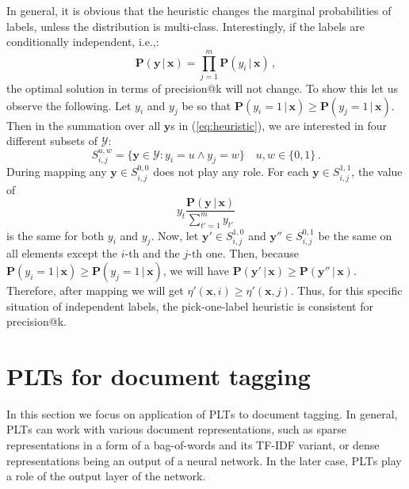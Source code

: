 \documentclass{article}
\newcommand{\Algo}[1]{\textsc{#1}}
\renewcommand{\vec}[1]{\boldsymbol{#1}}
\newcommand{\bx}{\vec{x}}
\newcommand{\by}{\vec{y}}
\newcommand{\calY}{\mathcal{Y}}
\newcommand{\prob}{\mathbf{P}}
\newcommand{\given}{\, | \,}
\newcommand{\sectionBefore}{-0pt}
\newcommand{\sectionAfter}{-0pt}
\begin{document}
In general, it is obvious that the heuristic changes the marginal probabilities of labels, unless the distribution is multi-class. 
Interestingly, if the labels are conditionally independent, i.e.,:
$$
\prob(\by \given \bx) = \prod_{j=1}^m \prob(y_i \given \bx)\,,
$$
the optimal solution in terms of precision@k will not change. To show this let us observe the following.
Let $y_i$ and $y_j$ be so that $\prob(y_i = 1 \given \bx) \ge \prob(y_j = 1 \given \bx) $. Then in the summation over all $\by$s in (\ref{eq:heuristic}), we are interested in four different subsets of $\calY$: 
$$
S_{i,j}^{u,w}  =  \{\by\in \calY: y_i = u \land y_j = w\} \quad u,w \in \{0,1\} \,.
$$
During mapping any $\by \in S^{0,0}_{i,j}$ does not play any role. For each $\by \in S^{1,1}_{i,j}$, the value of 
$$
y_t \frac{\prob(\by \given \bx)}{\sum_{t'=1}^m y_{t'}}
$$ 
is the same for both $y_i$ and $y_j$. Now, let $\by' \in S^{1,0}_{i,j}$ and $\by'' \in S^{0,1}_{i,j}$ be the same on all elements except the $i$-th and the $j$-th one. Then, because   $\prob(y_i = 1 \given \bx) \ge \prob(y_j = 1 \given \bx) $, we will have $\prob(\by' \given \bx) \ge \prob(\by'' \given \bx)$. Therefore, after mapping we will get $\eta'(\bx,i) \ge \eta'(\bx, j)$. 
Thus, for this specific situation of independent labels, the pick-one-label heuristic is consistent for precision@k.

%
%
%




\vspace{\sectionBefore}
\section{PLTs for document tagging}
\label{sec:plt-tagging}
\vspace{\sectionAfter}

In this section we focus on application of \Algo{PLT}s to document tagging. In general, \Algo{PLT}s can work with various document representations, such as sparse representations in a form of a bag-of-words and its TF-IDF variant, or dense representations being an output of a neural network. In the later case, \Algo{PLT}s play a role of the output layer of the network. 
  
\end{document}
